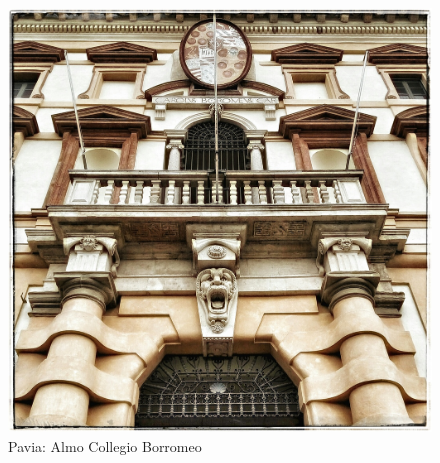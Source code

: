 \documentclass[nols]{tufte-handout}
\begin{document}
\begin{figure}[!b]
  \includegraphics[width=0.8\linewidth]{thumb-lesson_I.jpeg}
  \caption{Pavia: Almo Collegio Borromeo}
  \label{fig:textfig}
\end{figure}

 


\end{document}
